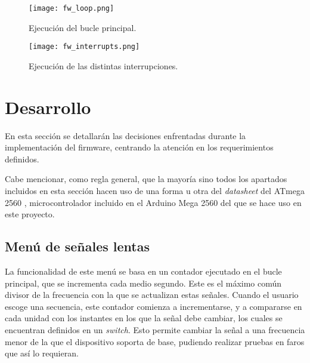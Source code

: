 \begin{figure}[h!]
    \centering
    \texttt{[image: fw\_loop.png]}
    \caption{Ejecución del bucle principal.}
    \label{fig:fw_loop}
\end{figure}

\begin{figure}[h!]
    \centering
    \texttt{[image: fw\_interrupts.png]}
    \caption{Ejecución de las distintas interrupciones.}
    \label{fig:fw_interrupts}
\end{figure}

\section{Desarrollo}

En esta sección se detallarán las decisiones enfrentadas durante la implementación del firmware, centrando la atención en los requerimientos definidos.


Cabe mencionar, como regla general, que la mayoría sino todos los apartados incluidos en esta sección hacen uso de una forma u otra del \textit{datasheet} del ATmega 2560 \cite{atmega2560}, microcontrolador incluido en el Arduino Mega 2560 del que se hace uso en este proyecto.

\subsection{Menú de señales lentas}

La funcionalidad de este menú se basa en un contador ejecutado en el bucle principal, que se incrementa cada medio segundo. Este es el máximo común divisor de la frecuencia con la que se actualizan estas señales. Cuando el usuario escoge una secuencia, este contador comienza a incrementarse, y a compararse en cada unidad con los instantes en los que la señal debe cambiar, los cuales se encuentran definidos en un \textit{switch}. Esto permite cambiar la señal a una frecuencia menor de la que el dispositivo soporta de base, pudiendo realizar pruebas en faros que así lo requieran.

